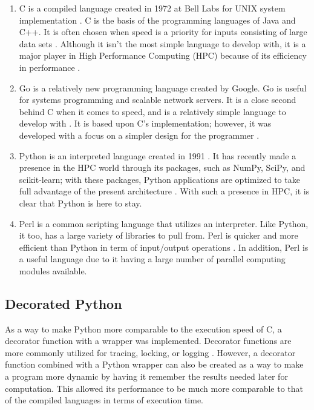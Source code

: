 \documentclass{sig-alternate}
\begin{document}
\begin{enumerate}
\item {\em}C is a compiled language created in 1972 at Bell Labs for UNIX system implementation \cite{languages}. C is the basis of the programming languages of Java and C++. It is often chosen when speed is a priority for inputs consisting of large data sets \cite{nicepaper1}. Although it isn't the most simple language to develop with, it is a major player in High Performance Computing (HPC) because of its efficiency in performance \cite{HPC}.
\item {\em}Go is a relatively new programming language created by Google. Go is useful for systems programming and scalable network servers. It is a close second behind C when it comes to speed, and is a relatively simple language to develop with \cite{HPC}. It is based upon C's implementation; however, it was developed with a focus on a simpler design for the programmer \cite{HPC}. 
\item {\em}Python is an interpreted language created in 1991 \cite{Python}. It has recently made a presence in the HPC world through its packages, such as NumPy, SciPy, and scikit-learn; with these packages, Python applications are optimized to take full 
advantage of the present architecture \cite{Python}. With such a presence in HPC, it is clear that Python is here to stay.
\item  {\em}Perl is a common scripting language that utilizes an interpreter. Like Python, it too, has a large variety of libraries to pull from. Perl is quicker and more efficient than Python in term of input/output operations \cite{Bioinformatics}. In addition, Perl is a useful language due to it having a large number of parallel computing modules available.
\end{enumerate}


\subsection{Decorated Python}

As a way to make Python more comparable to the execution speed of C, a decorator function with a wrapper was implemented. Decorator functions are more commonly utilized for tracing, locking, or logging \cite{nicepaper2}. However, a decorator function combined with a Python wrapper can also be created as a way to make a program more dynamic by having it remember the results needed later for computation. This allowed its performance to be much more comparable to that of the compiled languages in terms of execution time.
\end{document}
